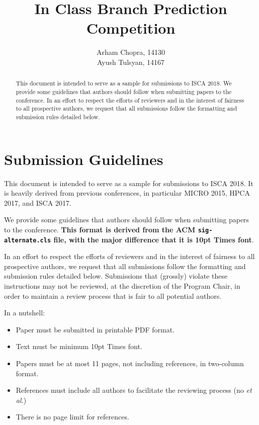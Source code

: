 \documentclass{sig-alternate}
\title{In Class Branch Prediction Competition}
\author{Arham Chopra, 14130 \\ Ayush Tulsyan, 14167}
\begin{document}
\maketitle
\thispagestyle{firstpage}
\pagestyle{plain}

\begin{abstract}

This document is intended to serve as a sample for submissions to ISCA 2018. We provide some guidelines that authors should follow when submitting papers to the conference. In an effort to respect the efforts of reviewers and in the interest of fairness to all prospective authors, we request that all submissions follow the formatting and submission rules detailed below. 

\end{abstract}

\section{Submission Guidelines}

This document is intended to serve as a sample for submissions to ISCA 2018. It is heavily derived from previous conferences, in particular MICRO 2015, HPCA 2017, and ISCA 2017.

We provide some guidelines that authors should follow when submitting papers to the conference. \textbf{This format is derived from the ACM \texttt{sig-alternate.cls} file, with the major difference that it is 10pt Times font}.

In an effort to respect the efforts of reviewers and in the interest of fairness to all prospective authors, we request that all submissions follow the formatting and submission rules detailed below. Submissions that (grossly) violate these instructions may not be reviewed, at the discretion of the Program Chair, in order to maintain a review process that is fair to all potential authors.

\vspace{1ex}In a nutshell:

\begin{itemize}
\item Paper must be submitted in printable PDF format.
\item Text must be minimum 10pt Times font.
\item Papers must be at most 11 pages, not including references, in two-column format.
\item References must include all authors to facilitate the reviewing process (no \emph{et al.})
\item There is no page limit for references.
\end{itemize}
\end{document}
